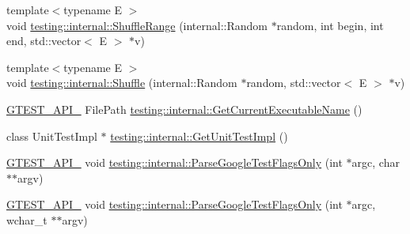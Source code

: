 \begin{DoxyCompactItemize}
\item 
{\footnotesize template$<$typename E $>$ }\\void \hyperlink{namespacetesting_1_1internal_a0e1d3dc36138a591769412d4c7779861}{testing\+::internal\+::\+Shuffle\+Range} (internal\+::\+Random $\ast$random, int begin, int end, std\+::vector$<$ E $>$ $\ast$v)
\item 
{\footnotesize template$<$typename E $>$ }\\void \hyperlink{namespacetesting_1_1internal_a90d9e6ffe8522a7eb1b2ce9b1a0c4673}{testing\+::internal\+::\+Shuffle} (internal\+::\+Random $\ast$random, std\+::vector$<$ E $>$ $\ast$v)
\item 
\hyperlink{gtest-port_8h_aa73be6f0ba4a7456180a94904ce17790}{G\+T\+E\+S\+T\+\_\+\+A\+P\+I\+\_\+} File\+Path \hyperlink{namespacetesting_1_1internal_a7a2bbf069f75bc99873976ad6fc356ad}{testing\+::internal\+::\+Get\+Current\+Executable\+Name} ()
\item 
class Unit\+Test\+Impl $\ast$ \hyperlink{namespacetesting_1_1internal_a9bd0caf5d16512de38b39599c13ee634}{testing\+::internal\+::\+Get\+Unit\+Test\+Impl} ()
\item 
\hyperlink{gtest-port_8h_aa73be6f0ba4a7456180a94904ce17790}{G\+T\+E\+S\+T\+\_\+\+A\+P\+I\+\_\+} void \hyperlink{namespacetesting_1_1internal_a472880afbcc592a41e3d623e2dec8412}{testing\+::internal\+::\+Parse\+Google\+Test\+Flags\+Only} (int $\ast$argc, char $\ast$$\ast$argv)
\item 
\hyperlink{gtest-port_8h_aa73be6f0ba4a7456180a94904ce17790}{G\+T\+E\+S\+T\+\_\+\+A\+P\+I\+\_\+} void \hyperlink{namespacetesting_1_1internal_aa3c81a67914856448d0778990d9d9cab}{testing\+::internal\+::\+Parse\+Google\+Test\+Flags\+Only} (int $\ast$argc, wchar\+\_\+t $\ast$$\ast$argv)
\end{DoxyCompactItemize}
